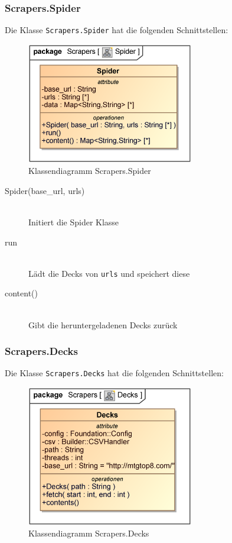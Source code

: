 \subsubsection{Scrapers.Spider}
Die Klasse \verb|Scrapers.Spider| hat die folgenden Schnittstellen:

\begin{figure}[H]
    \myfloatalign
    \includegraphics[width=0.65\textwidth]{gfx/MtGDeepAnalysis/Spider.eps}
    \caption{Klassendiagramm Scrapers.Spider}
    \label{fig:class:Scrapers.Spider}
\end{figure}

\begin{description}
    \item[Spider(base\_url, urls)] \hfill \\
    Initiert die Spider Klasse
    
    \item[run] \hfill \\
    Lädt die Decks von \verb|urls| und speichert diese
    
    \item[content()] \hfill \\
    Gibt die heruntergeladenen Decks zurück
\end{description}

\subsubsection{Scrapers.Decks}
Die Klasse \verb|Scrapers.Decks| hat die folgenden Schnittstellen:

\begin{figure}[H]
    \myfloatalign
    \includegraphics[width=0.65\textwidth]{gfx/MtGDeepAnalysis/Decks.eps}
    \caption{Klassendiagramm Scrapers.Decks}
    \label{fig:class:Scrapers.Decks}
\end{figure}

